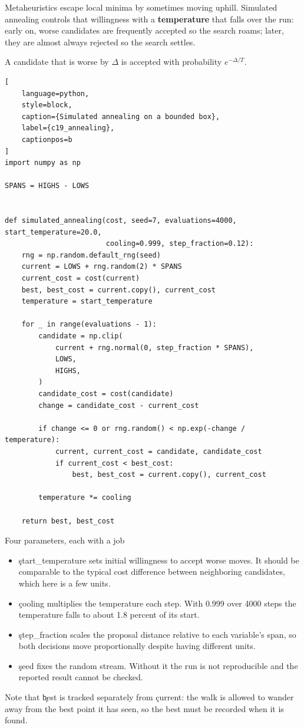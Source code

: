 
Metaheuristics escape local minima by sometimes moving uphill. Simulated
annealing controls that willingness with a \textbf{temperature} that falls over
the run: early on, worse candidates are frequently accepted so the search roams;
later, they are almost always rejected so the search settles.

A candidate that is worse by $\Delta$ is accepted with probability
$e^{-\Delta / T}$.

\begin{lstlisting}[
    language=python,
    style=block,
    caption={Simulated annealing on a bounded box},
    label={c19_annealing},
    captionpos=b
]
import numpy as np

SPANS = HIGHS - LOWS


def simulated_annealing(cost, seed=7, evaluations=4000, start_temperature=20.0,
                        cooling=0.999, step_fraction=0.12):
    rng = np.random.default_rng(seed)
    current = LOWS + rng.random(2) * SPANS
    current_cost = cost(current)
    best, best_cost = current.copy(), current_cost
    temperature = start_temperature

    for _ in range(evaluations - 1):
        candidate = np.clip(
            current + rng.normal(0, step_fraction * SPANS),
            LOWS,
            HIGHS,
        )
        candidate_cost = cost(candidate)
        change = candidate_cost - current_cost

        if change <= 0 or rng.random() < np.exp(-change / temperature):
            current, current_cost = candidate, candidate_cost
            if current_cost < best_cost:
                best, best_cost = current.copy(), current_cost

        temperature *= cooling

    return best, best_cost
\end{lstlisting}

\begin{SyntaxBox}{Four parameters, each with a job}
\begin{itemize}
    \item \c{start_temperature} sets initial willingness to accept worse moves.
          It should be comparable to the typical cost difference between
          neighboring candidates, which here is a few units.
    \item \c{cooling} multiplies the temperature each step. With 0.999 over 4000
          steps the temperature falls to about 1.8 percent of its start.
    \item \c{step_fraction} scales the proposal distance relative to each
          variable's span, so both decisions move proportionally despite having
          different units.
    \item \c{seed} fixes the random stream. Without it the run is not
          reproducible and the reported result cannot be checked.
\end{itemize}
Note that \c{best} is tracked separately from \c{current}: the walk is allowed
to wander away from the best point it has seen, so the best must be recorded
when it is found.
\end{SyntaxBox}

